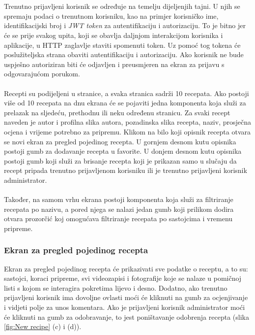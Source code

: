 \documentclass[times, utf8, zavrsni]{fer}
\begin{document}
\\\\
Trenutno prijavljeni korisnik se određuje na temelju dijeljenjih tajni.
U njih se spremaju podaci o trenutnom korisniku, kao na primjer korisničko ime, identifikacijski
broj i \textit{JWT token} za autentifikaciju i autorizaciju.
To je bitno jer će se prije svakog upita, koji se obavlja daljnjom interakcijom
korisnika i aplikacije, u HTTP zaglavlje staviti spomenuti token. Uz pomoć tog tokena će
poslužiteljska strana obaviti autentifikaciju i autorizaciju. Ako korisnik ne bude uspješno
autoriziran biti će odjavljen i preusmjeren na ekran za prijavu s odgovarajućom porukom.
\\\\
Recepti su podijeljeni u stranice,
a svaka stranica sadrži 10 recepata. Ako postoji više od 10 recepata na dnu ekrana će se pojaviti
jedna komponenta koja služi za prelazak na sljedeću, prethodnu ili neku određenu stranicu.
Za svaki recept naveden je autor i profilna slika autora, pozadinska slika recepta, naziv,
prosječna ocjena i vrijeme potrebno za pripremu. Klikom na bilo koji opisnik recepta otvara se novi ekran
za pregled pojedinog recepta. U gornjem desnom kutu opisnika postoji
gumb za dodavanje recepta u favorite. U donjem desnom kutu opisnika postoji gumb koji služi za brisanje recepta koji
je prikazan samo u slučaju da recept pripada trenutno prijavljenom korisniku ili je trenutno prijavljeni
korisnik administrator.
\\\\
Također, na samom vrhu ekrana postoji komponenta koja služi za filtriranje recepata po nazivu,
a pored njega se nalazi jedan gumb koji prilikom dodira otvara prozorčić koj
omogućava filtriranje recepata po sastojcima i vremenu pripreme.


\subsubsection{Ekran za pregled pojedinog recepta}
Ekran za pregled pojedinog recepta će prikazivati sve podatke o receptu, a to su:
sastojci, koraci pripreme, svi videozapisi i fotografije
koje se nalaze u pomičnoj listi s kojom se interagira pokretima lijevo i desno. Dodatno, ako
trenutno prijavljeni korisnik ima dovoljne ovlasti moći će kliknuti na gumb za ocjenjivanje i
vidjeti polje za unos komentara. Ako je prijavljeni korisnik administrator moći će kliknuti na
gumb za odobravanje, to jest poništavanje odobrenja recepta (slika \ref{fig:New recipe} (c) i (d)).
\end{document}
